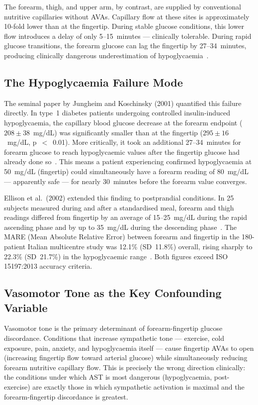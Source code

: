 The forearm, thigh, and upper arm, by contrast, are supplied by conventional nutritive capillaries without AVAs. Capillary flow at these sites is approximately 10-fold lower than at the fingertip. During stable glucose conditions, this lower flow introduces a delay of only 5--15~minutes --- clinically tolerable. During rapid glucose transitions, the forearm glucose can lag the fingertip by 27--34~minutes, producing clinically dangerous underestimation of hypoglycaemia~\cite{jungheim2001}.

\subsection*{The Hypoglycaemia Failure Mode}

The seminal paper by Jungheim and Koschinsky (2001) quantified this failure directly. In type~1 diabetes patients undergoing controlled insulin-induced hypoglycaemia, the capillary blood glucose decrease at the forearm endpoint ($208 \pm 38$~mg/dL) was significantly smaller than at the fingertip ($295 \pm 16$~mg/dL, p~$<$~0.01). More critically, it took an additional 27--34~minutes for forearm glucose to reach hypoglycaemic values after the fingertip glucose had already done so~\cite{jungheim2001}. This means a patient experiencing confirmed hypoglycaemia at 50~mg/dL (fingertip) could simultaneously have a forearm reading of 80~mg/dL --- apparently safe --- for nearly 30~minutes before the forearm value converges.

Ellison et al.\ (2002) extended this finding to postprandial conditions. In 25 subjects measured during and after a standardised meal, forearm and thigh readings differed from fingertip by an average of 15--25~mg/dL during the rapid ascending phase and by up to 35~mg/dL during the descending phase~\cite{ellison2002}. The MARE (Mean Absolute Relative Error) between forearm and fingertip in the 180-patient Italian multicentre study was 12.1\% (SD~11.8\%) overall, rising sharply to 22.3\% (SD~21.7\%) in the hypoglycaemic range~\cite{fedele2003}. Both figures exceed ISO 15197:2013 accuracy criteria.

\subsection*{Vasomotor Tone as the Key Confounding Variable}

Vasomotor tone is the primary determinant of forearm-fingertip glucose discordance. Conditions that increase sympathetic tone --- exercise, cold exposure, pain, anxiety, and hypoglycaemia itself --- cause fingertip AVAs to open (increasing fingertip flow toward arterial glucose) while simultaneously reducing forearm nutritive capillary flow. This is precisely the wrong direction clinically: the conditions under which AST is most dangerous (hypoglycaemia, post-exercise) are exactly those in which sympathetic activation is maximal and the forearm-fingertip discordance is greatest.

